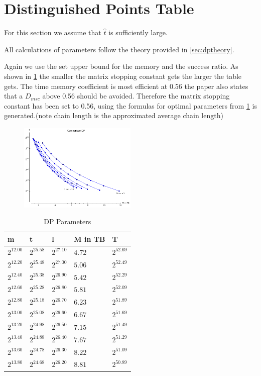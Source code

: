 \section{Distinguished Points Table}
For this section we assume that $\hat{t}$ is sufficiently large.

All calculations of parameters follow the theory provided in
\ref{sec:dptheory}.

Again we use the set upper bound for the memory and the success ratio.
As shown in \ref{fig:dpHmsc} the smaller the matrix stopping constant
gets the larger the table gets. The time memory coefficient is most
efficient at 0.56 \cite{176} the paper also states that a $D_{msc}$ above
0.56 should be avoided. Therefore the matrix stopping constant has been
set to 0.56, using the formulas for optimal parameters from \cite{176}
\ref{tab:DPparam} is generated.(note chain length is the approximated average chain length)
\begin{figure}[H]
  \centering
    \includegraphics[width=0.5\textwidth]{figures/compareDmsc.png}
    \label{fig:dpHmsc}
\end{figure}
\begin{table}[H]
  \centering
\begin{tabular}{lllll}
m & t & l & M in TB & T \\\hline
$2^{12.00}$ & $2^{25.58}$ & $2^{27.10}$ & $4.72$ & $2^{52.69}$ \\
$2^{12.20}$ & $2^{25.48}$ & $2^{27.00}$ & $5.06$ & $2^{52.49}$ \\
$2^{12.40}$ & $2^{25.38}$ & $2^{26.90}$ & $5.42$ & $2^{52.29}$ \\
$2^{12.60}$ & $2^{25.28}$ & $2^{26.80}$ & $5.81$ & $2^{52.09}$ \\
$2^{12.80}$ & $2^{25.18}$ & $2^{26.70}$ & $6.23$ & $2^{51.89}$ \\
$2^{13.00}$ & $2^{25.08}$ & $2^{26.60}$ & $6.67$ & $2^{51.69}$ \\
$2^{13.20}$ & $2^{24.98}$ & $2^{26.50}$ & $7.15$ & $2^{51.49}$ \\
$2^{13.40}$ & $2^{24.88}$ & $2^{26.40}$ & $7.67$ & $2^{51.29}$ \\
$2^{13.60}$ & $2^{24.78}$ & $2^{26.30}$ & $8.22$ & $2^{51.09}$ \\
$2^{13.80}$ & $2^{24.68}$ & $2^{26.20}$ & $8.81$ & $2^{50.89}$ \\
\end{tabular}
  \caption{DP Parameters}
  \label{tab:DPparam}
\end{table}
